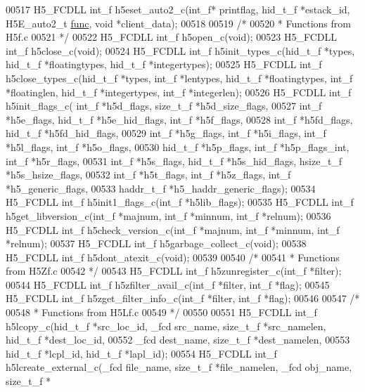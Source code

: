 \begin{DoxyCode}
00517 H5\_FCDLL int\_f h5eset\_auto2\_c(int\_f* printflag, hid\_t\_f *estack\_id, H5E\_auto2\_t 
      \hyperlink{structfunc}{func}, \textcolor{keywordtype}{void} *client\_data);
00518 
00519 \textcolor{comment}{/*}
00520 \textcolor{comment}{ * Functions from H5f.c}
00521 \textcolor{comment}{ */}
00522 H5\_FCDLL int\_f h5open\_c(\textcolor{keywordtype}{void});
00523 H5\_FCDLL int\_f h5close\_c(\textcolor{keywordtype}{void});
00524 H5\_FCDLL int\_f h5init\_types\_c(hid\_t\_f *types, hid\_t\_f *floatingtypes, hid\_t\_f *integertypes);
00525 H5\_FCDLL int\_f h5close\_types\_c(hid\_t\_f *types, int\_f *lentypes, hid\_t\_f *floatingtypes, int\_f *floatinglen,
       hid\_t\_f *integertypes, int\_f *integerlen);
00526 H5\_FCDLL int\_f h5init\_flags\_c( int\_f *h5d\_flags, size\_t\_f *h5d\_size\_flags, 
00527         int\_f *h5e\_flags, hid\_t\_f *h5e\_hid\_flags, int\_f *h5f\_flags,
00528                 int\_f *h5fd\_flags, hid\_t\_f *h5fd\_hid\_flags,
00529                 int\_f *h5g\_flags, int\_f *h5i\_flags, int\_f *h5l\_flags, int\_f *h5o\_flags,
00530                 hid\_t\_f *h5p\_flags, int\_f *h5p\_flags\_int, int\_f *h5r\_flags, 
00531                 int\_f *h5s\_flags, hid\_t\_f *h5s\_hid\_flags, hsize\_t\_f *h5s\_hsize\_flags, 
00532         int\_f *h5t\_flags, int\_f *h5z\_flags, int\_f *h5\_generic\_flags,
00533                 haddr\_t\_f *h5\_haddr\_generic\_flags);
00534 H5\_FCDLL int\_f h5init1\_flags\_c(int\_f *h5lib\_flags);
00535 H5\_FCDLL int\_f h5get\_libversion\_c(int\_f *majnum, int\_f *minnum, int\_f *relnum);
00536 H5\_FCDLL int\_f h5check\_version\_c(int\_f *majnum, int\_f *minnum, int\_f *relnum);
00537 H5\_FCDLL int\_f h5garbage\_collect\_c(\textcolor{keywordtype}{void});
00538 H5\_FCDLL int\_f h5dont\_atexit\_c(\textcolor{keywordtype}{void});
00539 
00540 \textcolor{comment}{/*}
00541 \textcolor{comment}{ * Functions from H5Zf.c}
00542 \textcolor{comment}{ */}
00543 H5\_FCDLL int\_f h5zunregister\_c(int\_f *filter);
00544 H5\_FCDLL int\_f h5zfilter\_avail\_c(int\_f *filter, int\_f *flag);
00545 H5\_FCDLL int\_f h5zget\_filter\_info\_c(int\_f *filter, int\_f *flag);
00546 
00547 \textcolor{comment}{/*}
00548 \textcolor{comment}{ * Functions from H5Lf.c}
00549 \textcolor{comment}{ */}
00550 
00551 H5\_FCDLL int\_f h5lcopy\_c(hid\_t\_f *src\_loc\_id, \_fcd src\_name, size\_t\_f *src\_namelen, hid\_t\_f *dest\_loc\_id,
00552               \_fcd dest\_name, size\_t\_f *dest\_namelen,
00553               hid\_t\_f *lcpl\_id, hid\_t\_f *lapl\_id);
00554 H5\_FCDLL int\_f h5lcreate\_external\_c(\_fcd file\_name, size\_t\_f *file\_namelen, \_fcd obj\_name, size\_t\_f *

\end{DoxyCode}
